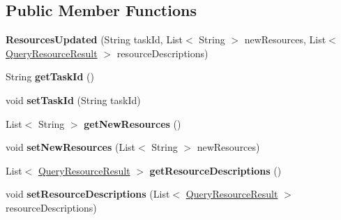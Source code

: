 \subsection*{Public Member Functions}
\begin{DoxyCompactItemize}
\item 
\mbox{\label{classeu_1_1h2020_1_1symbiote_1_1enabler_1_1messaging_1_1model_1_1ResourcesUpdated_ac85b8ce07139009326bc69be2f65d4d5}} 
{\bfseries Resources\+Updated} (String task\+Id, List$<$ String $>$ new\+Resources, List$<$ \hyperlink{classeu_1_1h2020_1_1symbiote_1_1core_1_1ci_1_1QueryResourceResult}{Query\+Resource\+Result} $>$ resource\+Descriptions)
\item 
\mbox{\label{classeu_1_1h2020_1_1symbiote_1_1enabler_1_1messaging_1_1model_1_1ResourcesUpdated_a3dc436f3d6e10f5a033ae6f618b9b7d7}} 
String {\bfseries get\+Task\+Id} ()
\item 
\mbox{\label{classeu_1_1h2020_1_1symbiote_1_1enabler_1_1messaging_1_1model_1_1ResourcesUpdated_abe9bb6abd19e3f928d36e528387ae639}} 
void {\bfseries set\+Task\+Id} (String task\+Id)
\item 
\mbox{\label{classeu_1_1h2020_1_1symbiote_1_1enabler_1_1messaging_1_1model_1_1ResourcesUpdated_aefcac1bc3056864fa024becb377bcf07}} 
List$<$ String $>$ {\bfseries get\+New\+Resources} ()
\item 
\mbox{\label{classeu_1_1h2020_1_1symbiote_1_1enabler_1_1messaging_1_1model_1_1ResourcesUpdated_a34ec8cb7e66578d587e32dd23cea207c}} 
void {\bfseries set\+New\+Resources} (List$<$ String $>$ new\+Resources)
\item 
\mbox{\label{classeu_1_1h2020_1_1symbiote_1_1enabler_1_1messaging_1_1model_1_1ResourcesUpdated_a3e1ee0801e8979d9ec08fc274a063c00}} 
List$<$ \hyperlink{classeu_1_1h2020_1_1symbiote_1_1core_1_1ci_1_1QueryResourceResult}{Query\+Resource\+Result} $>$ {\bfseries get\+Resource\+Descriptions} ()
\item 
\mbox{\label{classeu_1_1h2020_1_1symbiote_1_1enabler_1_1messaging_1_1model_1_1ResourcesUpdated_a614008102a6799095883be29372d7089}} 
void {\bfseries set\+Resource\+Descriptions} (List$<$ \hyperlink{classeu_1_1h2020_1_1symbiote_1_1core_1_1ci_1_1QueryResourceResult}{Query\+Resource\+Result} $>$ resource\+Descriptions)
\end{DoxyCompactItemize}


